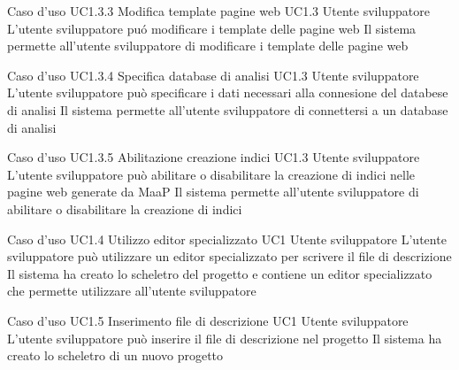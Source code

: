 \UCtitle
{Caso d'uso UC1.3.3}
{Modifica template pagine web}
\UC
{UC1.3}
{Utente sviluppatore}
{L'utente sviluppatore pu\'o modificare i template delle pagine web}
{Il sistema permette all'utente sviluppatore di modificare i template delle pagine web}

\UCtitle
{Caso d'uso UC1.3.4}
{Specifica database di analisi}
\UC
{UC1.3}
{Utente sviluppatore}
{L'utente sviluppatore può specificare i dati necessari alla connesione del databese di analisi}
{Il sistema permette all'utente sviluppatore di connettersi a un database di analisi}

\UCtitle
{Caso d'uso UC1.3.5}
{Abilitazione creazione indici}
\UC
{UC1.3}
{Utente sviluppatore}
{L'utente sviluppatore può abilitare o disabilitare la creazione di indici nelle pagine web generate da MaaP}
{Il sistema permette all'utente sviluppatore di abilitare o disabilitare la creazione di indici}

\UCtitle
{Caso d'uso UC1.4}
{Utilizzo editor specializzato}
\UC
{UC1}
{Utente sviluppatore}
{L'utente sviluppatore può utilizzare un editor specializzato per scrivere il file di descrizione}
{Il sistema ha creato lo scheletro del progetto e contiene un editor specializzato che permette utilizzare all'utente sviluppatore}

\UCtitle
{Caso d'uso UC1.5}
{Inserimento file di descrizione}
\UC
{UC1}
{Utente sviluppatore}
{L'utente sviluppatore può inserire il file di descrizione nel progetto}
{Il sistema ha creato lo scheletro di un nuovo progetto}


